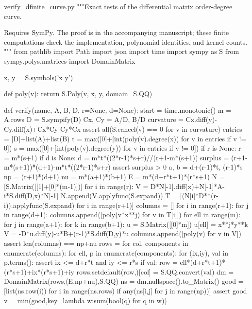 \begin{filecontents*}[overwrite]{verify_dfinite_curve.py}
"""Exact tests of the differential matrix order-degree curve.

Requires SymPy. The proof is in the accompanying manuscript; these finite
computations check the implementation, polynomial identities, and kernel counts.
"""
from pathlib import Path
import json
import time
import sympy as S
from sympy.polys.matrices import DomainMatrix

x, y = S.symbols('x y')

def poly(v):
    return S.Poly(v, x, y, domain=S.QQ)

def verify(name, A, B, D, r=None, d=None):
    start = time.monotonic()
    m = A.rows
    D = S.sympify(D)
    Cx, Cy = A/D, B/D
    curvature = Cx.diff(y)-Cy.diff(x)+Cx*Cy-Cy*Cx
    assert all(S.cancel(v) == 0 for v in curvature)
    entries = [D]+list(A)+list(B)
    t = max([0]+[int(poly(v).degree(x)) for v in entries if v != 0])
    s = max([0]+[int(poly(v).degree(y)) for v in entries if v != 0])
    if r is None:
        r = m*(s+1)
    if d is None:
        d = m*t*((2*r-1)*s+r)//(r+1-m*(s+1))
    surplus = (r+1-m*(s+1))*(d+1)-m*t*((2*r-1)*s+r)
    assert surplus > 0
    a, b = d+(r-1)*t, (r-1)*s
    np = (r+1)*(d+1)
    nu = m*(a+1)*(b+1)
    E = m*(d+r*t+1)*(r*s+1)
    N = [S.Matrix([[1]+[0]*(m-1)])]
    for i in range(r):
        V = D*N[-1].diff(x)+N[-1]*A-i*S.diff(D,x)*N[-1]
        N.append(V.applyfunc(S.expand))
    T = [(N[i]*D**(r-i)).applyfunc(S.expand) for i in range(r+1)]
    columns = []
    for i in range(r+1):
        for j in range(d+1):
            columns.append([poly(v*x**j) for v in T[i]])
    for ell in range(m):
        for j in range(a+1):
            for k in range(b+1):
                u = S.Matrix([[0]*m])
                u[ell] = x**j*y**k
                V = -D*u.diff(y)-u*B+(r-1)*S.diff(D,y)*u
                columns.append([poly(v) for v in V])
    assert len(columns) == np+nu
    rows = {}
    for col, components in enumerate(columns):
        for ell, p in enumerate(components):
            for (ix,iy), val in p.terms():
                assert ix <= d+r*t and iy <= r*s
                if val:
                    row = ell*(d+r*t+1)*(r*s+1)+ix*(r*s+1)+iy
                    rows.setdefault(row,{})[col] = S.QQ.convert(val)
    dm = DomainMatrix(rows,(E,np+nu),S.QQ)
    ns = dm.nullspace().to_Matrix()
    good = [list(ns.row(i)) for i in range(ns.rows)
            if any(ns[i,j] for j in range(np))]
    assert good
    v = min(good,key=lambda w:sum(bool(q) for q in w))

\end{filecontents*}
